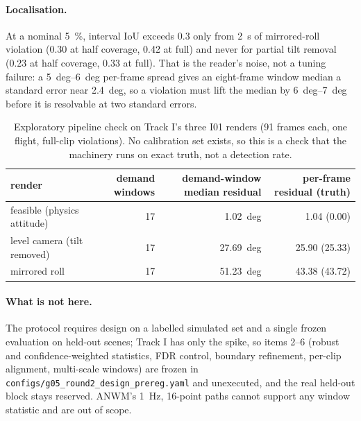 \paragraph{Localisation.} At a nominal \SI{5}{\percent}, interval IoU exceeds \num{0.3} only from
\SI{2}{s} of mirrored-roll violation (\num{0.30} at half coverage, \num{0.42} at full) and never
for partial tilt removal (\num{0.23} at half coverage, \num{0.33} at full). That is the reader's
noise, not a tuning failure: a \SIrange{5}{6}{deg} per-frame spread gives an eight-frame window
median a standard error near \SI{2.4}{deg}, so a violation must lift the median by
\SIrange{6}{7}{deg} before it is resolvable at two standard errors.

\begin{table}[t]
\centering
\caption{Exploratory pipeline check on Track I's three I01 renders (91 frames each, one flight,
full-clip violations). No calibration set exists, so this is a check that the machinery runs on
exact truth, not a detection rate.}
\label{tab:g2-spike}
\begin{tabular}{lrrr}
\toprule
render & demand windows & demand-window median residual & per-frame residual (truth) \\
\midrule
feasible (physics attitude) & 17 & \SI{1.02}{deg} & 1.04 (0.00) \\
level camera (tilt removed) & 17 & \SI{27.69}{deg} & 25.90 (25.33) \\
mirrored roll & 17 & \SI{51.23}{deg} & 43.38 (43.72) \\
\bottomrule
\end{tabular}
\end{table}

\paragraph{What is not here.} The protocol requires design on a labelled simulated set and a
single frozen evaluation on held-out scenes; Track I has only the spike, so items 2--6 (robust and
confidence-weighted statistics, FDR control, boundary refinement, per-clip alignment, multi-scale
windows) are frozen in \texttt{configs/g05\_round2\_design\_prereg.yaml} and unexecuted, and the
real held-out block stays reserved. ANWM's \SI{1}{Hz}, 16-point paths cannot support any window
statistic and are out of scope.
